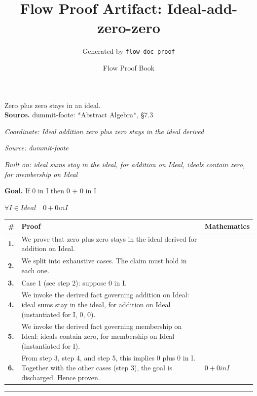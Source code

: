 \documentclass[11pt]{article}
\title{Flow Proof Artifact: Ideal-add-zero-zero}
\author{Generated by \texttt{flow doc proof}}
\date{Flow Proof Book}
\theoremstyle{definition}
\begin{document}
\maketitle
Zero plus zero stays in an ideal.\\[0.5em]
\textbf{Source.} dummit-foote: *Abstract Algebra*, §7.3\\[0.5em]
\bigskip
{}\par
\smallskip\noindent\textit{Coordinate: Ideal \cdot addition \cdot zero plus zero stays in the ideal derived}\par
\smallskip\noindent\textit{Source: dummit-foote}\par
\smallskip\noindent\textit{Built on: ideal sums stay in the ideal, for addition on Ideal, ideals contain zero, for membership on Ideal}\par
\medskip
\noindent\textbf{Goal.} If 0 in I then 0 + 0 in I\par
\noindent$\displaystyle \forall I \in Ideal\quad 0 + 0 in I$\par
\medskip
\noindent
\begin{tabular}{@{} >{\raggedright\arraybackslash}p{} >{\raggedright\arraybackslash}p{} >{\raggedleft\arraybackslash}p{} @{}}
\textbf{\#} & \textbf{Proof} & \textbf{Mathematics} \\
\midrule
\textbf{1.} & We prove that zero plus zero stays in the ideal derived for addition on Ideal. & \\[0.45em]
\textbf{2.} & We split into exhaustive cases. The claim must hold in each one. & \\[0.45em]
\textbf{3.} & Case 1 (see step 2): suppose 0 in I. & \\[0.45em]
\textbf{4.} & We invoke the derived fact governing addition on Ideal: ideal sums stay in the ideal, for addition on Ideal (instantiated for I, 0, 0). & \\[0.45em]
\textbf{5.} & We invoke the derived fact governing membership on Ideal: ideals contain zero, for membership on Ideal (instantiated for I). & \\[0.45em]
\textbf{6.} & From step 3, step 4, and step 5, this implies 0 plus 0 in I. Together with the other cases (step 3), the goal is discharged. Hence proven. & $\displaystyle 0 + 0 in I$ \\[0.45em]
\bottomrule
\end{tabular}
\label{thm:Ideal-addition-zero_plus_zero_stays_in_the_ideal_derived}
\par\medskip\hrule
\end{document}
